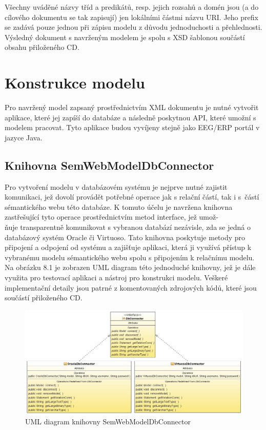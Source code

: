 \documentclass{projekt}
\begin{document}
Všechny uváděné názvy tříd a predikátů, resp. jejich rozsahů a domén jsou (a do cílového dokumentu se tak zapisují) jen lokálními částmi názvu URI. Jeho prefix se zadává pouze jednou při zápisu modelu z důvodu jednoduchosti a přehlednosti.
Výsledný dokument s navrženým modelem je spolu s XSD šablonou součástí obsahu přiloženého CD.

\section{Konstrukce modelu}
\hspace{0.65cm}Pro navržený model zapsaný prostřednictvím XML dokumentu je nutné vytvořit aplikace, které jej zapíší do databáze a následně poskytnou API, které umožní s modelem pracovat. Tyto aplikace budou vyvíjeny stejně jako EEG/ERP portál v jazyce Java.

\subsection{Knihovna SemWebModelDbConnector}
\hspace{0.65cm}Pro vytvoření modelu v databázovém systému je nejprve nutné zajistit komunikaci, jež dovolí provádět potřebné operace jak s relační částí, tak i s~částí sémantického webu této databáze. K tomuto účelu je navržena knihovna zastřešující tyto operace prostřednictvím metod interface, jež umož-\\ňuje transparentně komunikovat s vybranou databází  nezávisle, zda se jedná o databázový systém Oracle či Virtuoso. Tato knihovna poskytuje metody pro připojení a odpojení od systému a zajišťuje aplikaci, která ji využívá přístup k vybranému modelu sémantického webu spolu s připojením k relačnímu modelu. Na obrázku 8.1 je zobrazen UML diagram této jednoduché knihovny, jež je dále využita pro testovací aplikaci a nástroj pro konstrukci modelu. Veškeré implementační detaily jsou patrné z komentovaných zdrojových kódů, které jsou součástí přiloženého CD.

\vspace{0.65cm}

\begin{figure}[htb]
\begin{center}
\includegraphics[scale=0.46]{db-connect.jpg}
\caption{UML diagram knihovny SemWebModelDbConnector}
\end{center}
\end{figure}
\end{document}
